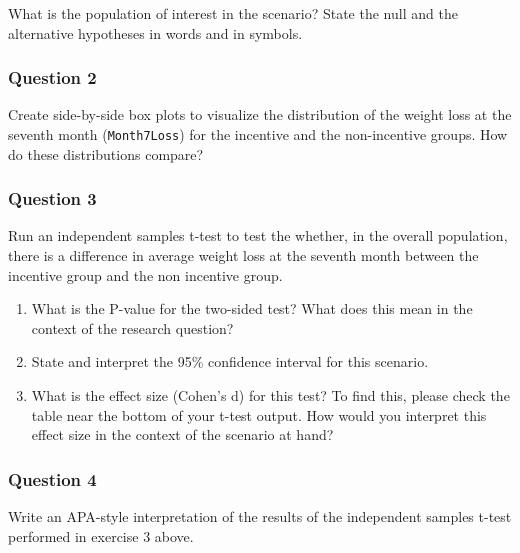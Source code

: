 \documentclass[
  letterpaper,
  DIV=11,
  numbers=noendperiod]{scrartcl}
\begin{document}
What is the population of interest in the scenario? State the null and
the alternative hypotheses in words and in symbols.

\subsubsection{Question 2}\label{question-2}

Create side-by-side box plots to visualize the distribution of the
weight loss at the seventh month (\texttt{Month7Loss}) for the incentive
and the non-incentive groups. How do these distributions compare?

\subsubsection{Question 3}\label{question-3}

Run an independent samples t-test to test the whether, in the overall
population, there is a difference in average weight loss at the seventh
month between the incentive group and the non incentive group.

\begin{enumerate}
\def\labelenumi{\alph{enumi})}
\item
  What is the P-value for the two-sided test? What does this mean in the
  context of the research question?
\item
  State and interpret the 95\% confidence interval for this scenario.
\item
  What is the effect size (Cohen's d) for this test? To find this,
  please check the table near the bottom of your t-test output. How
  would you interpret this effect size in the context of the scenario at
  hand?
\end{enumerate}

\subsubsection{Question 4}\label{question-4}

Write an APA-style interpretation of the results of the independent
samples t-test performed in exercise 3 above.
\end{document}
